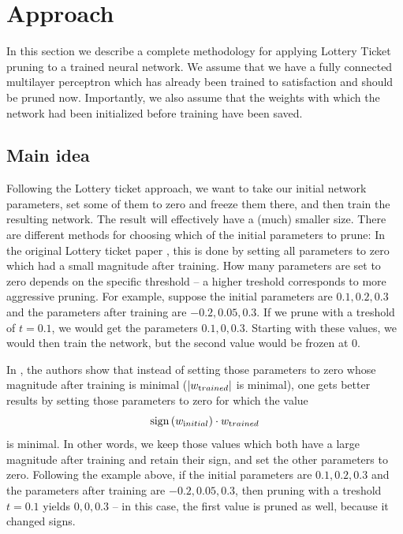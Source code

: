 \documentclass[12pt,final,twoside]{article}
\theoremstyle{plain}
\theoremstyle{definition}
\theoremstyle{remark}
\theoremstyle{named}
\begin{document}

\section{Approach}
In this section we describe a complete methodology for applying Lottery Ticket pruning to a trained neural network. We assume that we have a fully connected multilayer perceptron which has already been trained to satisfaction and should be pruned now. Importantly, we also assume that the weights with which the network had been initialized before training have been saved.

\subsection{Main idea}
Following the Lottery ticket approach, we want to take our initial network parameters, set some of them to zero and freeze them there, and then train the resulting network. The result will effectively have a (much) smaller size.
There are different methods for choosing which of the initial parameters to prune: In the original Lottery ticket paper \cite{lottery}, this is done by setting all parameters to zero which had a small magnitude after training. How many parameters are set to zero depends on the specific threshold -- a higher treshold corresponds to more aggressive pruning. For example, suppose the initial parameters are $0.1, 0.2, 0.3$ and the parameters after training are $-0.2, 0.05, 0.3$. If we prune with a treshold of $t = 0.1$, we would get the parameters $0.1, 0, 0.3$. Starting with these values, we would then train the network, but the second value would be frozen at $0$.

In \cite{supermask}, the authors show that instead of setting those parameters to zero whose magnitude after training is minimal ($|w_{\text trained}|$ is minimal), one gets better results by setting those parameters to zero for which the value 
$$
\operatorname{sign}\left(w_{\text initial}\right) \cdot w_{\text trained}
$$
is minimal. In other words, we keep those values which both have a large magnitude after training and retain their sign, and set the other parameters to zero. Following the example above, if the initial parameters are $0.1, 0.2, 0.3$ and the parameters after training are $-0.2, 0.05, 0.3$, then pruning with a treshold $t=0.1$ yields $0, 0, 0.3$ -- in this case, the first value is pruned as well, because it changed signs.
\end{document}
